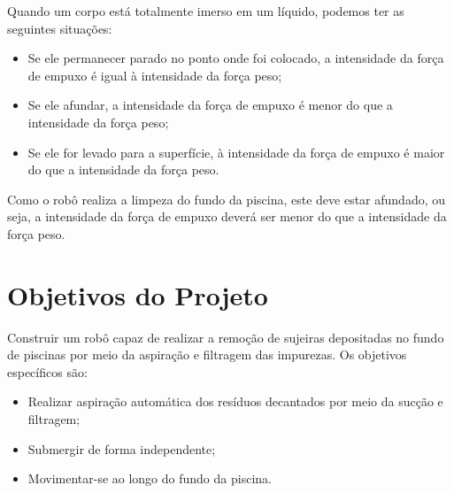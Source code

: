 Quando um corpo está totalmente imerso em um líquido, podemos ter as seguintes situações: 

\begin{itemize}
\item Se ele permanecer parado no ponto onde foi colocado, a intensidade da força de empuxo é igual à intensidade da força peso;
\item Se ele afundar, a intensidade da força de empuxo é menor do que a intensidade da força peso;
\item Se ele for levado para a superfície, à intensidade da força de empuxo é maior do que a intensidade da força peso.
\end{itemize}

Como o robô realiza a limpeza do fundo da piscina, este deve estar afundado, ou seja, a intensidade da força de empuxo deverá ser menor do que a intensidade da força peso.

\section{Objetivos do Projeto}
Construir um robô capaz de realizar a remoção de sujeiras depositadas no fundo de piscinas por meio da aspiração e filtragem das impurezas. Os objetivos específicos são:

\begin{itemize}
\item Realizar aspiração automática dos resíduos decantados por meio da sucção e filtragem;
\item Submergir de forma independente;
\item Movimentar-se ao longo do fundo da piscina.
\end{itemize}

